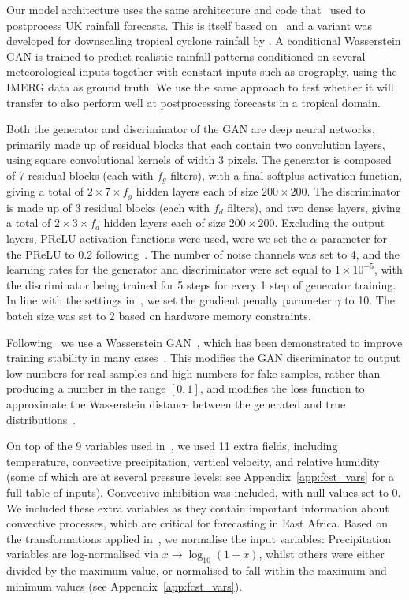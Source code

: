 \documentclass{article}
\begin{document}
Our model architecture uses the same architecture and code that~\cite{harris_generative_2022} used to postprocess UK rainfall forecasts. This is itself based on~\cite{leinonen_stochastic_2020} and a variant was developed for downscaling tropical cyclone rainfall by \cite{vosper_deep_2023}. A conditional Wasserstein GAN is trained to predict realistic rainfall patterns conditioned on several meteorological inputs together with constant inputs such as orography, using the IMERG data as ground truth. We use the same approach to test whether it will transfer to also perform well at postprocessing forecasts in a tropical domain. 

Both the generator and discriminator of the GAN are deep neural networks, primarily made up of residual blocks that each contain two convolution layers, using square convolutional kernels of width 3 pixels. The generator is composed of 7 residual blocks (each with $f_g$ filters), with a final softplus activation function, giving a total of $2 \times 7 \times f_g$ hidden layers each of size $200 \times 200$. The discriminator is made up of 3 residual blocks (each with $f_d$ filters), and two dense layers, giving a total of $2 \times 3 \times f_d$ hidden layers each of size $200 \times 200$. 
Excluding the output layers, PReLU activation functions were used, were we set the $\alpha$ parameter for the PReLU to 0.2 following~\cite{harris_generative_2022}. The number of noise channels was set to 4, and the learning rates for the generator and discriminator were set equal to $1\times 10^{-5}$, with the discriminator being trained for 5 steps for every 1 step of generator training. In line with the settings in~\cite{gulrajani_improved_2017}, we set the gradient penalty parameter $\gamma$ to 10. The batch size was set to 2 based on hardware memory constraints.

Following~\cite{harris_generative_2022} we use a Wasserstein GAN~\citep{arjovsky_wasserstein_2017}, which has been demonstrated to improve training stability in many cases~\citep{creswell_generative_2018}. This modifies the GAN discriminator to output low numbers for real samples and high numbers for fake samples, rather than producing a number in the range $[0,1]$, and modifies the loss function to approximate the Wasserstein distance between the generated and true distributions~\citep{gulrajani_improved_2017}.

On top of the 9 variables used in~\cite{harris_generative_2022}, we used 11 extra fields, including temperature, convective precipitation, vertical velocity, and relative humidity (some of which are at several pressure levels; see Appendix~\ref{app:fcst_vars} for a full table of inputs). Convective inhibition was included, with null values set to 0. We included these extra variables as they contain important information about convective processes, which are critical for forecasting in East Africa. Based on the transformations applied in~\cite{harris_generative_2022}, we normalise the input variables: Precipitation variables are log-normalised via $x \to \log_{10}(1 + x)$, whilst others were either divided by the maximum value, or normalised to fall within the maximum and minimum values (see Appendix~\ref{app:fcst_vars}).
\end{document}
